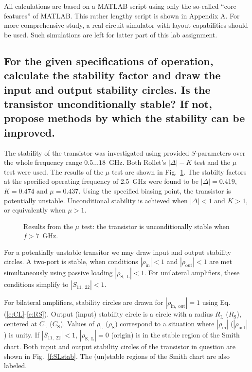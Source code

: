 \documentclass[a4paper, 12pt]{article}
\newcommand{\m}[1]{\mathrm{#1}}
\begin{document}
All calculations are based on a MATLAB script using only the so-called ``core features'' of MATLAB. 
This rather lengthy script is shown in Appendix A. For more comprehensive study, a real circuit 
simulator with layout capabilities should be used. Such simulations are left for latter part of 
this lab assignment.

\subsection{For the given specifications of operation, calculate the stability factor and draw the input 
and output stability circles. Is the transistor unconditionally stable? If not, propose methods by which the
stability can be improved.}

The stability of the transistor was investigated using provided $S$-parameters over the whole 
frequency range $0.5 \ldots 18$~GHz. Both Rollet's $|\Delta|-K$ test and the $\mu$ test were 
used. The results of the $\mu$ test are shown in Fig.~\ref{f:mu}. The stabilty factors at the 
specified operating frequency of 2.5~GHz were found to be $|\Delta| = 0.419$, $K = 0.474$ and 
$\mu = 0.437$. Using the specified biasing point, the transistor is potentially unstable. 
Unconditional stability is achieved when $|\Delta| < 1$ and $K > 1$, or equivalently when $\mu > 1$.

\begin{figure}[!h]
	\begin{center}
		\caption{Results from the $\mu$ test: the transistor is unconditionally stable when $f > 7$~GHz.}
		\label{f:mu}
	\end{center}
\end{figure}

For a potentially unstable transitor we may draw input and output stability circles. A two-port 
is stable, when conditions $|\rho_\mathrm{in}| < 1$ and $|\rho_\mathrm{out}| < 1$ are met 
simultaneously using passive loading $|\rho_\mathrm{S,\;L}| < 1$. For unilateral amplifiers, 
these conditions simplify to $|S_{11,\;22}| < 1$.

For bilateral amplifiers, stability circles are drawn for $|\rho_\mathrm{in,\;out}| = 1$ using Eq. 
(\ref{e:CL}-\ref{e:RS}). Output (input) stability circle is a circle with a radius $R_\m{L}$ ($R_\m{S}$), 
centered at $C_\m{L}$ ($C_\m{S}$). Values of $\rho_\m{L}$ ($\rho_\m{S}$) correspond to a situation 
where $|\rho_\mathrm{in}|$ ($|\rho_\mathrm{out}|$) is unity. If $|S_{11,\;22}| < 1$, $|\rho_\mathrm{S,\;L}| = 0$ 
(origin) is in the stable region of the Smith chart. Both input and output stability circles of the
transistor in question are shown in Fig.~\ref{f:SLstab}. The (un)stable regions of the Smith chart 
are also labeled.
\end{document}
